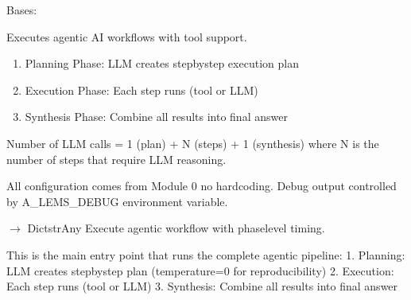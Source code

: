 \documentclass[letterpaper,10pt,english]{sphinxmanual}
\begin{document}
\begin{fulllineitems}
\label{\detokenize{core.execution:core.execution.AgenticExecutor}}
\pysigstartsignatures
\pysiglinewithargsret
{}
{}
{}
\pysigstopsignatures
\sphinxAtStartPar
Bases: 

\sphinxAtStartPar
Executes agentic AI workflows with tool support.
\begin{description}
\begin{enumerate}
%
\item {} 
\sphinxAtStartPar
Planning Phase: LLM creates step\sphinxhyphen{}by\sphinxhyphen{}step execution plan

\item {} 
\sphinxAtStartPar
Execution Phase: Each step runs (tool or LLM)

\item {} 
\sphinxAtStartPar
Synthesis Phase: Combine all results into final answer

\end{enumerate}

\end{description}

\sphinxAtStartPar
Number of LLM calls = 1 (plan) + N (steps) + 1 (synthesis)
where N is the number of steps that require LLM reasoning.

\sphinxAtStartPar
All configuration comes from Module 0 \textendash{} no hardcoding.
Debug output controlled by A\_LEMS\_DEBUG environment variable.

\begin{fulllineitems}
\label{\detokenize{core.execution:core.execution.AgenticExecutor.execute}}
\pysigstartsignatures
\pysiglinewithargsret
{}
{\sphinxparamcomma {}}
{{ $\rightarrow$ Dict\DUrole{p}{{[}}strAny\DUrole{p}{{]}}}}
\pysigstopsignatures
\sphinxAtStartPar
Execute agentic workflow with phase\sphinxhyphen{}level timing.
\begin{description}
\sphinxAtStartPar
This is the main entry point that runs the complete agentic pipeline:
1. Planning: LLM creates step\sphinxhyphen{}by\sphinxhyphen{}step plan (temperature=0 for reproducibility)
2. Execution: Each step runs (tool or LLM)
3. Synthesis: Combine all results into final answer


\end{description}
\end{fulllineitems}
\end{fulllineitems}
\end{document}
